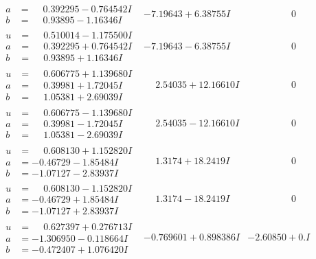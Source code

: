 \documentclass[1p]{elsarticle_modified}
\theoremstyle{definition}
\begin{document}
$$\begin{array}{c|c|c}
\begin{aligned}
a &= \phantom{-}0.392295 - 0.764542 I \\
b &= \phantom{-}0.93895 - 1.16346 I\end{aligned}
 & -7.19643 + 6.38755 I & \phantom{-0.000000 } 0 \\ \hline\begin{aligned}
u &= \phantom{-}0.510014 - 1.175500 I \\
a &= \phantom{-}0.392295 + 0.764542 I \\
b &= \phantom{-}0.93895 + 1.16346 I\end{aligned}
 & -7.19643 - 6.38755 I & \phantom{-0.000000 } 0 \\ \hline\begin{aligned}
u &= \phantom{-}0.606775 + 1.139680 I \\
a &= \phantom{-}0.39981 + 1.72045 I \\
b &= \phantom{-}1.05381 + 2.69039 I\end{aligned}
 & \phantom{-}2.54035 + 12.16610 I & \phantom{-0.000000 } 0 \\ \hline\begin{aligned}
u &= \phantom{-}0.606775 - 1.139680 I \\
a &= \phantom{-}0.39981 - 1.72045 I \\
b &= \phantom{-}1.05381 - 2.69039 I\end{aligned}
 & \phantom{-}2.54035 - 12.16610 I & \phantom{-0.000000 } 0 \\ \hline\begin{aligned}
u &= \phantom{-}0.608130 + 1.152820 I \\
a &= -0.46729 - 1.85484 I \\
b &= -1.07127 - 2.83937 I\end{aligned}
 & \phantom{-}1.3174 + 18.2419 I & \phantom{-0.000000 } 0 \\ \hline\begin{aligned}
u &= \phantom{-}0.608130 - 1.152820 I \\
a &= -0.46729 + 1.85484 I \\
b &= -1.07127 + 2.83937 I\end{aligned}
 & \phantom{-}1.3174 - 18.2419 I & \phantom{-0.000000 } 0 \\ \hline\begin{aligned}
u &= \phantom{-}0.627397 + 0.276713 I \\
a &= -1.306950 - 0.118664 I \\
b &= -0.472407 + 1.076420 I\end{aligned}
 & -0.769601 + 0.898386 I & -2.60850 + 0. I\phantom{ +0.000000I} \\ \hline\begin{aligned}

\end{aligned}
\end{array}$$
\end{document}
